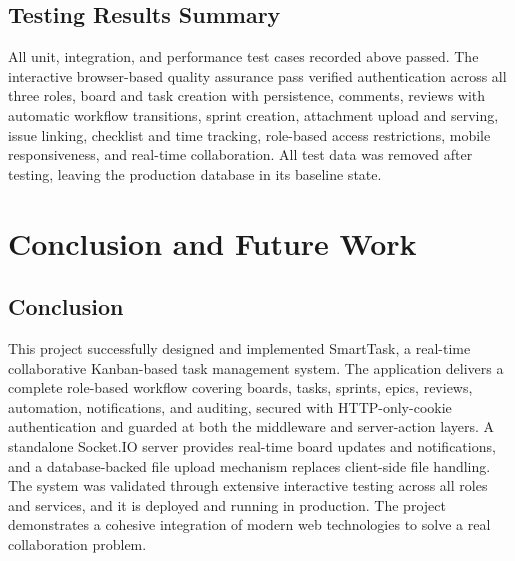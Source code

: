 \documentclass[12pt,a4paper]{report}
\begin{document}
\FloatBarrier

\section{Testing Results Summary}
All unit, integration, and performance test cases recorded above passed. The
interactive browser-based quality assurance pass verified authentication across
all three roles, board and task creation with persistence, comments, reviews with
automatic workflow transitions, sprint creation, attachment upload and serving,
issue linking, checklist and time tracking, role-based access restrictions, mobile
responsiveness, and real-time collaboration. All test data was removed after
testing, leaving the production database in its baseline state.

\chapter{Conclusion and Future Work}
\label{ch:conclusion}

\section{Conclusion}
This project successfully designed and implemented SmartTask, a real-time
collaborative Kanban-based task management system. The application delivers a
complete role-based workflow covering boards, tasks, sprints, epics, reviews,
automation, notifications, and auditing, secured with HTTP-only-cookie
authentication and guarded at both the middleware and server-action layers. A
standalone Socket.IO server provides real-time board updates and notifications,
and a database-backed file upload mechanism replaces client-side file handling.
The system was validated through extensive interactive testing across all roles
and services, and it is deployed and running in production. The project
demonstrates a cohesive integration of modern web technologies to solve a real
collaboration problem.
\end{document}
